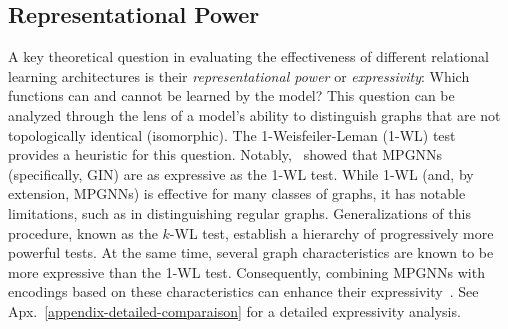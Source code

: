 \subsection{Representational Power}\label{appendix-1wl}
A key theoretical question in evaluating the effectiveness of different relational learning architectures is their \emph{representational power} or \emph{expressivity}: Which functions can and cannot be learned by the model? This question can be analyzed through the lens of a model’s ability to distinguish graphs that are not topologically identical (isomorphic). The 1-Weisfeiler-Leman (1-WL) test~\citep{weisfeiler1968reduction} provides a heuristic for this question. Notably,~\citet{xu2018powerful} showed that MPGNNs (specifically, GIN) are as expressive as the 1-WL test.
While 1-WL (and, by extension, MPGNNs) is effective for many classes of graphs, it has notable limitations, such as in distinguishing regular graphs. Generalizations of this procedure, known as the $k$-WL test, establish a hierarchy of progressively more powerful tests. At the same time, several graph characteristics are known to be more expressive than the 1-WL test. Consequently, combining MPGNNs with encodings based on these characteristics can enhance their expressivity~\citep{southern2023expressive, fesser2023effective, bouritsas2022improving}. See  Apx.~\ref{appendix-detailed-comparaison} for a detailed expressivity analysis.

